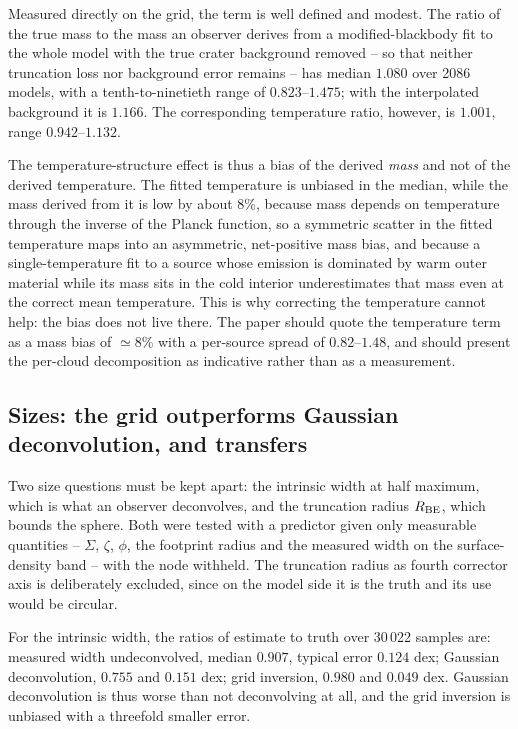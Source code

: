 \documentclass[11pt,a4paper]{article}
\begin{document}
Measured directly on the grid, the term is well defined and modest. The ratio
of the true mass to the mass an observer derives from a modified-blackbody fit
to the whole model with the true crater background removed -- so that neither
truncation loss nor background error remains -- has median $1.080$ over 2086
models, with a tenth-to-ninetieth range of $0.823$--$1.475$; with the
interpolated background it is $1.166$. The corresponding temperature ratio,
however, is $1.001$, range $0.942$--$1.132$.

The temperature-structure effect is thus a bias of the derived \emph{mass} and
not of the derived temperature. The fitted temperature is unbiased in the
median, while the mass derived from it is low by about $8$\%, because mass
depends on temperature through the inverse of the Planck function, so a
symmetric scatter in the fitted temperature maps into an asymmetric,
net-positive mass bias, and because a single-temperature fit to a source whose
emission is dominated by warm outer material while its mass sits in the cold
interior underestimates that mass even at the correct mean temperature. This is
why correcting the temperature cannot help: the bias does not live there. The
paper should quote the temperature term as a mass bias of $\simeq8$\% with a
per-source spread of $0.82$--$1.48$, and should present the per-cloud
decomposition as indicative rather than as a measurement.

\subsection{Sizes: the grid outperforms Gaussian deconvolution, and transfers}
\label{sec:practice-size}

Two size questions must be kept apart: the intrinsic width at half maximum,
which is what an observer deconvolves, and the truncation radius $R_{\rm BE}$,
which bounds the sphere. Both were tested with a predictor given only
measurable quantities -- $\Sigma$, $\zeta$, $\phi$, the footprint radius and
the measured width on the surface-density band -- with the node withheld. The
truncation radius as fourth corrector axis is deliberately excluded, since on
the model side it is the truth and its use would be circular.

For the intrinsic width, the ratios of estimate to truth over 30\,022 samples
are: measured width undeconvolved, median $0.907$, typical error $0.124$ dex;
Gaussian deconvolution, $0.755$ and $0.151$ dex; grid inversion, $0.980$ and
$0.049$ dex. Gaussian deconvolution is thus worse than not deconvolving at all,
and the grid inversion is unbiased with a threefold smaller error.
\end{document}
